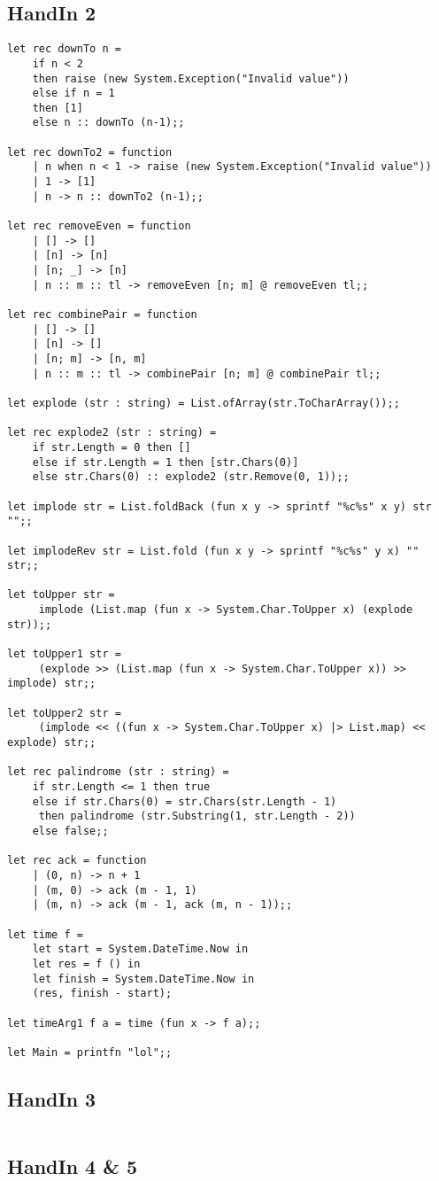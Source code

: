 \subsection{HandIn 2}
\label{Appendix_FSharp_Ulrik_2}
\begin{lstlisting}
let rec downTo n =
    if n < 2
    then raise (new System.Exception("Invalid value"))
    else if n = 1
    then [1]
    else n :: downTo (n-1);;

let rec downTo2 = function
    | n when n < 1 -> raise (new System.Exception("Invalid value"))
    | 1 -> [1]
    | n -> n :: downTo2 (n-1);;

let rec removeEven = function
    | [] -> []
    | [n] -> [n]
    | [n; _] -> [n]
    | n :: m :: tl -> removeEven [n; m] @ removeEven tl;;

let rec combinePair = function
    | [] -> []
    | [n] -> []
    | [n; m] -> [n, m]
    | n :: m :: tl -> combinePair [n; m] @ combinePair tl;;

let explode (str : string) = List.ofArray(str.ToCharArray());;

let rec explode2 (str : string) =
	if str.Length = 0 then []
	else if str.Length = 1 then [str.Chars(0)]
	else str.Chars(0) :: explode2 (str.Remove(0, 1));;
	
let implode str = List.foldBack (fun x y -> sprintf "%c%s" x y) str "";;

let implodeRev str = List.fold (fun x y -> sprintf "%c%s" y x) "" str;;

let toUpper str = 
     implode (List.map (fun x -> System.Char.ToUpper x) (explode str));;

let toUpper1 str = 
     (explode >> (List.map (fun x -> System.Char.ToUpper x)) >> implode) str;;

let toUpper2 str = 
     (implode << ((fun x -> System.Char.ToUpper x) |> List.map) << explode) str;;

let rec palindrome (str : string) =
    if str.Length <= 1 then true
    else if str.Chars(0) = str.Chars(str.Length - 1)
	 then palindrome (str.Substring(1, str.Length - 2))
    else false;;

let rec ack = function
    | (0, n) -> n + 1
    | (m, 0) -> ack (m - 1, 1)
    | (m, n) -> ack (m - 1, ack (m, n - 1));;

let time f =
    let start = System.DateTime.Now in
    let res = f () in
    let finish = System.DateTime.Now in
    (res, finish - start);

let timeArg1 f a = time (fun x -> f a);;

let Main = printfn "lol";;

\end{lstlisting}
\subsection{HandIn 3}
\label{Appendix_FSharp_Ulrik_3}
\begin{lstlisting}
\end{lstlisting}
\subsection{HandIn 4 \& 5}
\label{Appendix_FSharp_Ulrik_4and5}
\begin{lstlisting}
\end{lstlisting}